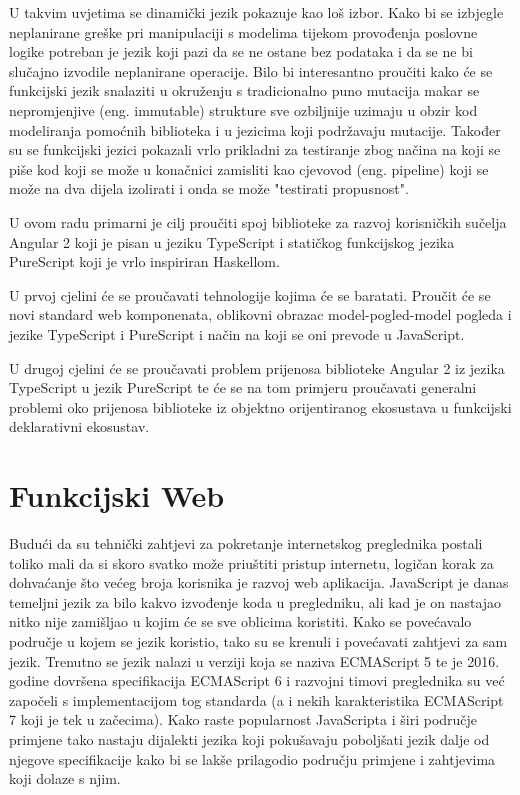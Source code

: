 \documentclass[times, utf8, zavrsni]{fer}
\begin{document}
U takvim uvjetima se dinamički jezik pokazuje kao loš izbor. Kako bi se izbjegle neplanirane greške pri manipulaciji s modelima tijekom provođenja poslovne logike potreban je jezik koji pazi da se ne ostane bez podataka i da se ne bi slučajno izvodile neplanirane operacije. Bilo bi interesantno proučiti kako će se funkcijski jezik snalaziti u okruženju s tradicionalno puno mutacija makar se nepromjenjive (eng. immutable) strukture sve ozbiljnije uzimaju u obzir kod modeliranja pomoćnih biblioteka i u jezicima koji podržavaju mutacije. Također su se funkcijski jezici pokazali vrlo prikladni za testiranje zbog načina na koji se piše kod koji se može u konačnici zamisliti kao cjevovod (eng. pipeline) koji se može na dva dijela izolirati i onda se može "testirati propusnost".

U ovom radu primarni je cilj proučiti spoj biblioteke za razvoj korisničkih sučelja Angular 2 koji je pisan u jeziku  TypeScript i statičkog funkcijskog jezika PureScript koji je vrlo inspiriran Haskellom.

U prvoj cjelini će se proučavati tehnologije kojima će se baratati. Proučit će se novi standard web komponenata, oblikovni obrazac model-pogled-model pogleda i jezike TypeScript i PureScript i način na koji se oni prevode u JavaScript.

U drugoj cjelini će se proučavati problem prijenosa biblioteke Angular 2 iz jezika TypeScript u jezik PureScript te će se na tom primjeru proučavati generalni problemi oko prijenosa biblioteke iz objektno orijentiranog ekosustava u funkcijski deklarativni ekosustav.

\chapter{Funkcijski Web}
Budući da su tehnički zahtjevi za pokretanje internetskog preglednika postali toliko mali da si skoro svatko može priuštiti pristup internetu, logičan korak za dohvaćanje što većeg broja korisnika je razvoj web aplikacija. JavaScript je danas temeljni jezik za bilo kakvo izvođenje koda u pregledniku, ali kad je on nastajao nitko nije zamišljao u kojim će se sve oblicima koristiti. Kako se povećavalo područje u kojem se jezik koristio, tako su se krenuli i povećavati zahtjevi za sam jezik. Trenutno se jezik nalazi u verziji koja se naziva ECMAScript 5 te je 2016. godine dovršena specifikacija ECMAScript 6 i razvojni timovi preglednika su već započeli s implementacijom tog standarda (a i nekih karakteristika ECMAScript 7 koji je tek u začecima). Kako raste popularnost JavaScripta i širi područje primjene tako nastaju dijalekti jezika koji pokušavaju poboljšati jezik dalje od njegove specifikacije kako bi se lakše prilagodio području primjene i zahtjevima koji dolaze s njim. 
\end{document}

